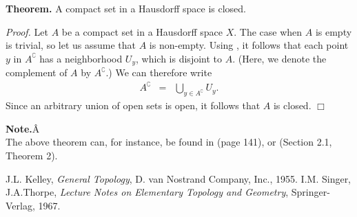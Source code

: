 \documentclass[12pt]{article}
\begin{document}
\newcommand{\comp}[0]{\complement}

{\bf Theorem.} A compact set in a Hausdorff space is closed.

\emph{Proof.}
Let $A$ be a compact set in a Hausdorff space $X$.
The case when $A$ is empty is trivial, so let us
assume that $A$ is non-empty.
Using , 
it follows that each point
$y$ in $A^{\comp}$ has a neighborhood $U_y$, which
is disjoint to $A$. (Here, we denote the complement of $A$
by $A^{\comp}$.)
We can therefore write
\begin{eqnarray*}
A^{\comp} &=& \bigcup_{y\in A^{\comp}} U_y.
\end{eqnarray*}
Since an arbitrary union of open sets is open, it follows that $A$ is
closed. $\Box$


{\bf Note.}Â \\
The above theorem can, for instance, be found in \cite{kelley} (page 141),
or \cite{singer} (Section 2.1, Theorem 2).

\begin{thebibliography}{9}
J.L. Kelley,
\emph{General Topology},
D. van Nostrand Company, Inc., 1955.
I.M. Singer, J.A.Thorpe,
\emph{Lecture Notes on Elementary Topology and Geometry},
Springer-Verlag, 1967.
\end{thebibliography}
\end{document}
